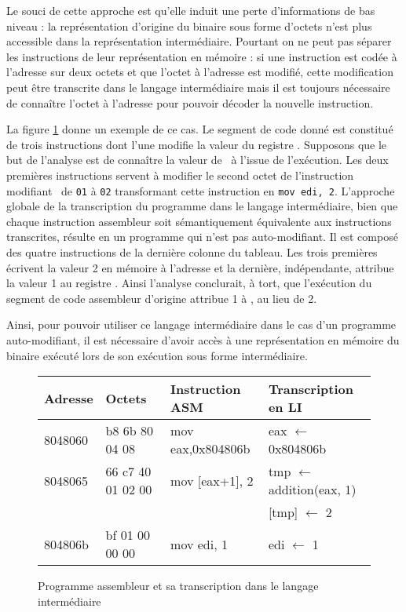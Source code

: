 Le souci de cette approche est qu'elle induit une perte d'informations de bas niveau : la représentation d'origine du binaire sous forme d'octets n'est plus accessible dans la représentation intermédiaire.
Pourtant on ne peut pas séparer les instructions de leur représentation en mémoire : si une instruction est codée à l'adresse  sur deux octets et que l'octet à l'adresse  est modifié, cette modification peut être transcrite dans le langage intermédiaire mais il est toujours nécessaire de connaître l'octet à l'adresse  pour pouvoir décoder la nouvelle instruction.

La figure \ref{fig:prg_asm_li} donne un exemple de ce cas. Le segment de code donné est constitué de trois instructions dont l'une modifie la valeur du registre \edi. Supposons que le but de l'analyse est de connaître la valeur de \edi\ à l'issue de l'exécution.
Les deux premières instructions servent à modifier le second octet de l'instruction modifiant \edi\ de \texttt{01} à \texttt{02} transformant cette instruction en \texttt{mov edi, 2}.
L'approche globale de la transcription du programme dans le langage intermédiaire, bien que chaque instruction assembleur soit sémantiquement équivalente aux instructions transcrites, résulte en un programme qui n'est pas auto-modifiant. Il est composé des quatre instructions de la dernière colonne du tableau.
Les trois premières écrivent la valeur 2 en mémoire à l'adresse  et la dernière, indépendante, attribue la valeur 1 au registre \edi.
Ainsi l'analyse conclurait, à tort, que l'exécution du segment de code assembleur d'origine attribue 1 à \edi, au lieu de 2.

Ainsi, pour pouvoir utiliser ce langage intermédiaire dans le cas d'un programme auto-modifiant, il est nécessaire d'avoir accès à une représentation en mémoire du binaire exécuté lors de son exécution sous forme intermédiaire.

\begin{figure}
\begin{center}
\begin{tabular}[b]{|l|l|l|l|}
\hline
Adresse & Octets & Instruction ASM & Transcription en LI\\ 
\hline
 8048060  &  b8 6b 80 04 08         &  mov    eax,0x804806b & eax $\leftarrow$ 0x804806b\\
 8048065  &  66 c7 40 01 02 00      &  mov    [eax+1], 2 & tmp $\leftarrow$ addition(eax, 1)\\
          &                         &                                & [tmp] $\leftarrow$ 2 \\
 804806b  &  bf 01 00 00 00         &  mov    edi, 1 & edi $\leftarrow$ 1 \\
\hline
\end{tabular}
\end{center}
\caption{Programme assembleur et sa transcription dans le langage intermédiaire}
\label{fig:prg_asm_li}
\end{figure}

